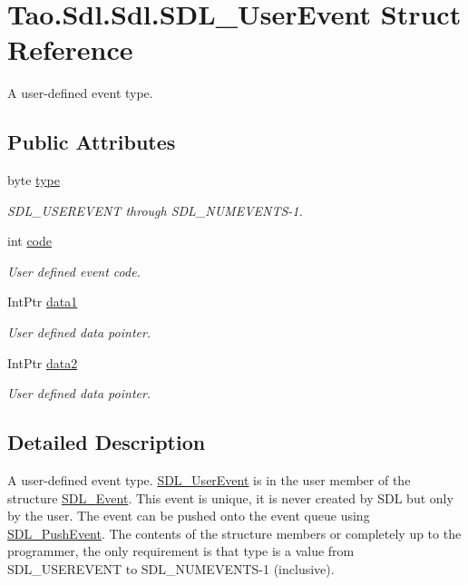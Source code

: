 \hypertarget{struct_tao_1_1_sdl_1_1_sdl_1_1_s_d_l___user_event}{
\section{Tao.Sdl.Sdl.SDL\_\-UserEvent Struct Reference}
\label{struct_tao_1_1_sdl_1_1_sdl_1_1_s_d_l___user_event}
}


A user-\/defined event type.  


\subsection*{Public Attributes}
\begin{DoxyCompactItemize}
\item 
byte \hyperlink{struct_tao_1_1_sdl_1_1_sdl_1_1_s_d_l___user_event_a3fd3d16ba0f9c61f4f2c5170e262e07d}{type}
\begin{DoxyCompactList}\small\item\em SDL\_\-USEREVENT through SDL\_\-NUMEVENTS-\/1. \item\end{DoxyCompactList}\item 
int \hyperlink{struct_tao_1_1_sdl_1_1_sdl_1_1_s_d_l___user_event_a84cc45701cf8751b178895e85d49bb08}{code}
\begin{DoxyCompactList}\small\item\em User defined event code. \item\end{DoxyCompactList}\item 
IntPtr \hyperlink{struct_tao_1_1_sdl_1_1_sdl_1_1_s_d_l___user_event_aa709beb1126baa571b3156f91f16b7bc}{data1}
\begin{DoxyCompactList}\small\item\em User defined data pointer. \item\end{DoxyCompactList}\item 
IntPtr \hyperlink{struct_tao_1_1_sdl_1_1_sdl_1_1_s_d_l___user_event_a44e085b5a784a0e85e07014be58fe54a}{data2}
\begin{DoxyCompactList}\small\item\em User defined data pointer. \item\end{DoxyCompactList}\end{DoxyCompactItemize}


\subsection{Detailed Description}
A user-\/defined event type. \hyperlink{struct_tao_1_1_sdl_1_1_sdl_1_1_s_d_l___user_event}{SDL\_\-UserEvent} is in the user member of the structure \hyperlink{struct_tao_1_1_sdl_1_1_s_d_l___event}{SDL\_\-Event}. This event is unique, it is never created by SDL but only by the user. The event can be pushed onto the event queue using \hyperlink{_sdl_8cs_a521bf458cc5cfc65b822c2b5b8226646}{SDL\_\-PushEvent}. The contents of the structure members or completely up to the programmer, the only requirement is that type is a value from SDL\_\-USEREVENT to SDL\_\-NUMEVENTS-\/1 (inclusive). 

